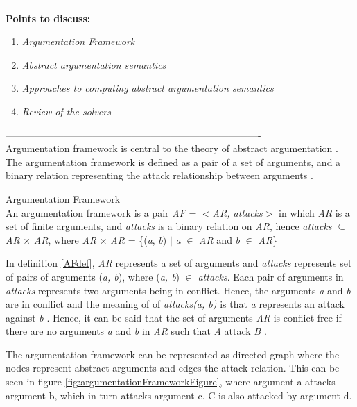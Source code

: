 -------------------------------------------------------------------------------\\
\textbf{Points to discuss:}
\begin{enumerate}
	\item{\textit{Argumentation Framework}}
	\item{\textit{Abstract argumentation semantics}}
	\item{\textit{Approaches to computing abstract argumentation semantics}}
	\item{\textit{Review of the solvers}}
\end{enumerate}
-------------------------------------------------------------------------------\\


Argumentation framework is central to the theory of abstract argumentation \cite{baroni2011introduction}. The argumentation framework is defined as a pair of a set of arguments, and a binary relation representing the attack relationship between arguments \cite{dung1995}. 

\theoremstyle{definition}
\begin{definition}{Argumentation Framework}
\label{AFdef}\\
An argumentation framework is a pair \textit{AF} = $<$\textit{AR, attacks}$>$ in which \textit{AR} is a set of finite arguments, and \textit{attacks} is a binary relation on \textit{AR}, hence \textit{attacks} $\subseteq$ \textit{AR} $\times$ \textit{AR}, where \textit{AR} $\times$ \textit{AR} = \{(\textit{a}, \textit{b}) $\vert$ \textit{a} $\in$ \textit{AR} and \textit{b} $\in$ \textit{AR}\}
\end{definition}

In definition \ref{AFdef}, \textit{AR} represents a set of arguments and \textit{attacks} represents set of pairs of arguments (\textit{a, b}), where (\textit{a, b}) $\in$ \textit{attacks}. Each pair of arguments in \textit{attacks} represents two arguments being in conflict. Hence, the arguments \textit{a} and \textit{b} are in conflict and the meaning of of \textit{attacks(a, b)} is that \textit{a} represents an attack against \textit{b} \cite{dung1995}. Hence, it can be said that the set of arguments \textit{AR} is conflict free if there are no arguments \textit{a} and \textit{b} in \textit{AR} such that \textit{A} attack \textit{B} \cite{dung1995}.
\newline
 
 
The argumentation framework can be represented as directed graph where the nodes represent abstract arguments and edges the attack relation. This can be seen in figure \ref{fig:argumentationFrameworkFigure}, where argument a attacks argument b, which in turn attacks argument c. C is also attacked by argument d.

